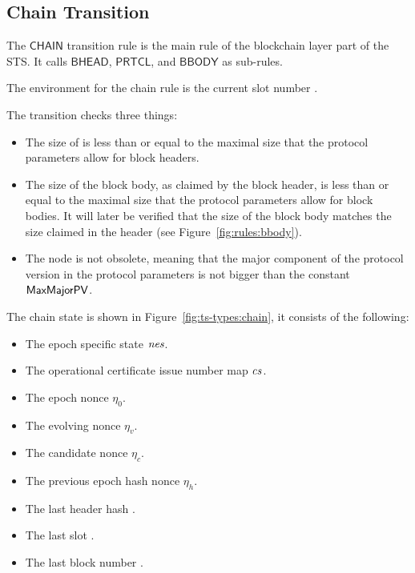 \clearpage

\subsection{Chain Transition}
\label{sec:chain-trans}

The $\mathsf{CHAIN}$ transition rule is the main rule of the blockchain layer
part of the STS. It calls $\mathsf{BHEAD}$, $\mathsf{PRTCL}$, and $\mathsf{BBODY}$ as sub-rules.

The environment for the chain rule is the current slot number .

The transition checks three things:
\begin{itemize}
\item The size of  is less than or equal to the maximal size that the
  protocol parameters allow for block headers.
\item The size of the block body, as claimed by the block header, is less than or equal to the
  maximal size that the protocol parameters allow for block bodies.
  It will later be verified that the size of the block body matches the size claimed
  in the header (see Figure~\ref{fig:rules:bbody}).
\item The node is not obsolete, meaning that the major component of the
  protocol version in the protocol parameters
  is not bigger than the constant $\mathsf{MaxMajorPV}$.
\end{itemize}


The chain state is shown in Figure~\ref{fig:ts-types:chain}, it consists of the
following:

\begin{itemize}
  \item The epoch specific state $\mathit{nes}$.
  \item The operational certificate issue number map $\mathit{cs}$.
  \item The epoch nonce $\eta_0$.
  \item The evolving nonce $\eta_v$.
  \item The candidate nonce $\eta_c$.
  \item The previous epoch hash nonce $\eta_h$.
  \item The last header hash .
  \item The last slot .
  \item The last block number .
\end{itemize}

